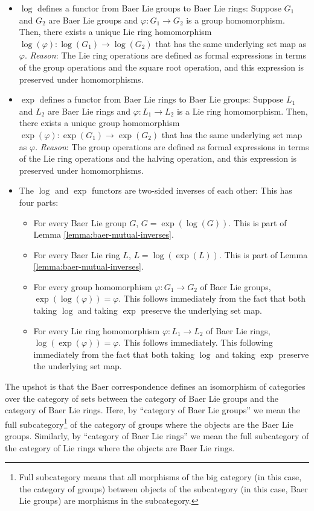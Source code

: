 \begin{itemize}
\item $\log$ defines a functor from Baer Lie groups to Baer Lie rings:
  Suppose $G_1$ and $G_2$ are Baer Lie groups and $\varphi:G_1 \to
  G_2$ is a group homomorphism. Then, there exists a unique Lie ring
  homomorphism $\log(\varphi): \log(G_1) \to \log(G_2)$ that has the
  same underlying set map as $\varphi$. {\em Reason}: The Lie ring
  operations are defined as formal expressions in terms of the group
  operations and the square root operation, and this expression is
  preserved under homomorphisms.
\item $\exp$ defines a functor from Baer Lie rings to Baer Lie groups:
  Suppose $L_1$ and $L_2$ are Baer Lie rings and $\varphi:L_1 \to L_2$
  is a Lie ring homomorphism. Then, there exists a unique group
  homomorphism $\exp(\varphi): \exp(G_1) \to \exp(G_2)$ that has the
  same underlying set map as $\varphi$. {\em Reason}: The group
  operations are defined as formal expressions in terms of the Lie
  ring operations and the halving operation, and this expression is
  preserved under homomorphisms.
\item The $\log$ and $\exp$ functors are two-sided inverses of each
  other: This has four parts:
  \begin{itemize}
    \item For every Baer Lie group $G$, $G = \exp(\log(G))$. This is
      part of Lemma \ref{lemma:baer-mutual-inverses}.
    \item For every Baer Lie ring $L$, $L = \log(\exp(L))$. This is
      part of Lemma \ref{lemma:baer-mutual-inverses}.
    \item For every group homomorphism $\varphi:G_1 \to G_2$ of Baer
      Lie groups, $\exp(\log(\varphi)) = \varphi$. This follows
      immediately from the fact that both taking $\log$ and taking
      $\exp$ preserve the underlying set map.
    \item For every Lie ring homomorphism $\varphi:L_1 \to L_2$ of
      Baer Lie rings, $\log(\exp(\varphi)) = \varphi$. This follows
      immediately. This following immediately from the fact that both
      taking $\log$ and taking $\exp$ preserve the underlying set map.
  \end{itemize}
\end{itemize}

The upshot is that the Baer correspondence defines an isomorphism of
categories over the category of sets between the category of Baer Lie
groups and the category of Baer Lie rings. Here, by ``category of Baer
Lie groups'' we mean the full subcategory\footnote{Full subcategory
  means that all morphisms of the big category (in this case, the
  category of groups) between objects of the subcategory (in this
  case, Baer Lie groups) are morphisms in the subcategory.} of the
category of groups where the objects are the Baer Lie
groups. Similarly, by ``category of Baer Lie rings'' we mean the full
subcategory of the category of Lie rings where the objects are Baer
Lie rings.


